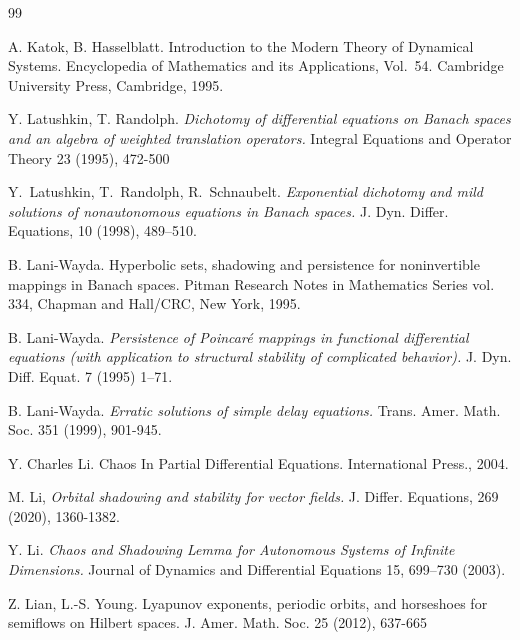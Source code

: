 \documentclass[12pt]{article}
\theoremstyle{definition}
\begin{document}
\begin{thebibliography}{99}
{%

A. Katok, B. Hasselblatt. Introduction to the Modern Theory of Dynamical Systems. Encyclopedia of Mathematics and its Applications, Vol.~54. Cambridge University Press, Cambridge, 1995.

Y. Latushkin, T. Randolph.
\textit{Dichotomy of differential equations on Banach spaces and an algebra of weighted translation operators.}
Integral Equations and Operator Theory 23 (1995), 472-500

Y.~Latushkin, T.~Randolph, R.~Schnaubelt.
\newblock \textit{Exponential dichotomy and mild solutions of nonautonomous equations in Banach spaces.}
\newblock J. Dyn. Differ. Equations, 10 (1998), 489--510.


B. Lani-Wayda.
Hyperbolic sets, shadowing and persistence for noninvertible mappings in Banach spaces. Pitman Research Notes in Mathematics Series vol. 334, Chapman and Hall/CRC, New York, 1995.

B. Lani-Wayda.  
\textit{Persistence of Poincaré mappings in functional differential equations (with application to structural stability of complicated behavior).} 
J. Dyn. Diff. Equat. 7 (1995) 1–71. 

B. Lani-Wayda.  
\textit{Erratic solutions of simple delay equations.} 
Trans. Amer. Math. Soc. 351 (1999), 901-945. 

Y. Charles Li.
Chaos In Partial Differential Equations.
International Press., 2004. 
 
M. Li,\textit{ Orbital shadowing and stability for vector fields.} J. Differ. Equations, 269 (2020), 1360-1382.

Y. Li. \textit{Chaos and Shadowing Lemma for Autonomous Systems of Infinite Dimensions.} Journal of Dynamics and Differential Equations 15, 699–730 (2003). %

Z. Lian, L.-S. Young.
Lyapunov exponents, periodic orbits, and horseshoes for semiflows on Hilbert spaces.
J. Amer. Math. Soc. 25 (2012), 637-665


}
\end{thebibliography}
\end{document}
